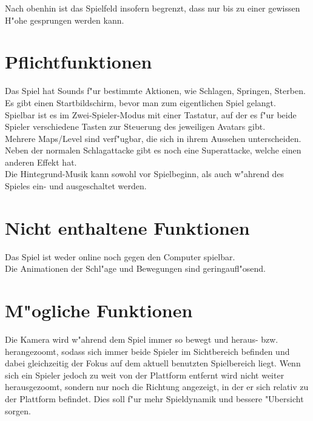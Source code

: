 \documentclass[a4paper, 11pt]{article}
\begin{document}
    \noindent
    Nach obenhin ist das Spielfeld insofern begrenzt, dass nur bis zu einer gewissen H"ohe gesprungen werden kann.

    \section{Pflichtfunktionen}\label{sec:muss}
    Das Spiel hat Sounds f"ur bestimmte Aktionen, wie Schlagen, Springen, Sterben.\\

    \noindent
    Es gibt einen Startbildschirm, bevor man zum eigentlichen Spiel gelangt.\\

    \noindent
    Spielbar ist es im Zwei-Spieler-Modus mit einer Tastatur, auf der es f"ur beide Spieler verschiedene
    Tasten zur Steuerung des jeweiligen Avatars gibt.\\

    \noindent
    Mehrere Maps/Level sind verf"ugbar, die sich in ihrem Aussehen unterscheiden.\\

    \noindent
    Neben der normalen Schlagattacke gibt es noch eine Superattacke, welche einen anderen Effekt hat.\\

    \noindent
    Die Hintegrund-Musik kann sowohl vor Spielbeginn, als auch w"ahrend des Spieles ein- und ausgeschaltet werden.

    \section{Nicht enthaltene Funktionen}\label{sec:kann-nicht}

    Das Spiel ist weder online noch gegen den Computer spielbar.\\

    \noindent
    Die Animationen der Schl"age und Bewegungen sind geringaufl"osend.

    \section{M"ogliche Funktionen}\label{sec:kann}

    Die Kamera wird w"ahrend dem Spiel immer so bewegt und heraus- bzw. herangezoomt, sodass sich immer beide
    Spieler im Sichtbereich befinden und dabei gleichzeitig der Fokus auf dem aktuell benutzten Spielbereich liegt.
    Wenn sich ein Spieler jedoch zu weit von der Plattform entfernt wird nicht weiter herausgezoomt, sondern nur noch die
    Richtung angezeigt, in der er sich relativ zu der Plattform befindet.
    Dies soll f"ur mehr Spieldynamik und bessere "Ubersicht sorgen.\\
\end{document}
